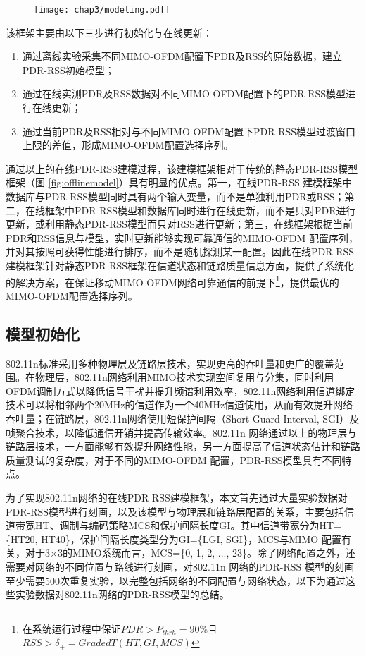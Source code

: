 \begin{figure}[!htp]
\centering
\texttt{[image: chap3/modeling.pdf]}
\end{figure}

该框架主要由以下三步进行初始化与在线更新：
\begin{enumerate}
  \item 通过离线实验采集不同MIMO-OFDM配置下PDR及RSS的原始数据，建立PDR-RSS初始模型；
  \item 通过在线实测PDR及RSS数据对不同MIMO-OFDM配置下的PDR-RSS模型进行在线更新；
  \item 通过当前PDR及RSS相对与不同MIMO-OFDM配置下PDR-RSS模型过渡窗口上限的差值，形成MIMO-OFDM配置选择序列。
\end{enumerate}

通过以上的在线PDR-RSS建模过程，该建模框架相对于传统的静态PDR-RSS模型框架（图 \ref{fig:offlinemodel}）具有明显的优点。第一，在线PDR-RSS 建模框架中数据库与PDR-RSS模型同时具有两个输入变量，而不是单独利用PDR或RSS；第二，在线框架中PDR-RSS模型和数据库同时进行在线更新，而不是只对PDR进行更新，或利用静态PDR-RSS模型而只对RSS进行更新；第三，在线框架根据当前PDR和RSS信息与模型，实时更新能够实现可靠通信的MIMO-OFDM 配置序列，并对其按照可获得性能进行排序，而不是随机探测某一配置。因此在线PDR-RSS建模框架针对静态PDR-RSS框架在信道状态和链路质量信息方面，提供了系统化的解决方案，在保证移动MIMO-OFDM网络可靠通信的前提下\footnote{在系统运行过程中保证$PDR>P_{thrh}=90\%$且$RSS>\delta_+=GradedT(HT, GI, MCS)$}，提供最优的MIMO-OFDM配置选择序列。


\subsection{模型初始化}
\label{sec:initial}

802.11n标准采用多种物理层及链路层技术，实现更高的吞吐量和更广的覆盖范围。在物理层，802.11n网络利用MIMO技术实现空间复用与分集，同时利用OFDM调制方式以降低信号干扰并提升频谱利用效率，802.11n网络利用信道绑定技术可以将相邻两个20MHz的信道作为一个40MHz信道使用，从而有效提升网络吞吐量；在链路层，802.11n网络使用短保护间隔（Short Guard Interval, SGI）及帧聚合技术，以降低通信开销并提高传输效率。802.11n 网络通过以上的物理层与链路层技术，一方面能够有效提升网络性能，另一方面提高了信道状态估计和链路质量测试的复杂度，对于不同的MIMO-OFDM 配置，PDR-RSS模型具有不同特点。

为了实现802.11n网络的在线PDR-RSS建模框架，本文首先通过大量实验数据对PDR-RSS模型进行刻画，以及该模型与物理层和链路层配置的关系，主要包括信道带宽HT、调制与编码策略MCS和保护间隔长度GI。其中信道带宽分为HT=\{HT20, HT40\}，保护间隔长度类型分为GI=\{LGI, SGI\}，MCS与MIMO 配置有关，对于3$\times$3的MIMO系统而言，MCS=\{0, 1, 2, ..., 23\}。除了网络配置之外，还需要对网络的不同位置与路线进行刻画，对802.11n 网络的PDR-RSS 模型的刻画至少需要500次重复实验，以完整包括网络的不同配置与网络状态，以下为通过这些实验数据对802.11n网络的PDR-RSS模型的总结。

